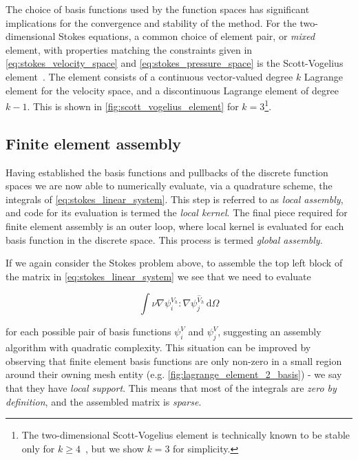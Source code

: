 \documentclass[thesis]{subfiles}
\begin{document}
The choice of basis functions used by the function spaces has significant implications for the convergence and stability of the method.
For the two-dimensional Stokes equations, a common choice of element pair, or \textit{mixed} element, with properties matching the constraints given in \cref{eq:stokes_velocity_space} and \cref{eq:stokes_pressure_space} is the Scott-Vogelius element~\cite{scottNormEstimatesMaximal1985}.
The element consists of a continuous vector-valued degree $k$ Lagrange element for the velocity space, and a discontinuous Lagrange element of degree $k-1$.
This is shown in \cref{fig:scott_vogelius_element} for $k = 3$\footnote{The two-dimensional Scott-Vogelius element is technically known to be stable only for $k \geq 4$~\cite{guzmanScottVogeliusFiniteElements2018}, but we show $k = 3$ for simplicity.}.

\subsection{Finite element assembly}

Having established the basis functions and pullbacks of the discrete function spaces we are now able to numerically evaluate, via a quadrature scheme, the integrals of \cref{eq:stokes_linear_system}.
This step is referred to as \textit{local assembly}, and code for its evaluation is termed the \textit{local kernel}.
The final piece required for finite element assembly is an outer loop, where local kernel is evaluated for each basis function in the discrete space.
This process is termed \textit{global assembly}.

If we again consider the Stokes problem above, to assemble the top left block of the matrix in \cref{eq:stokes_linear_system} we see that we need to evaluate

\begin{equation}
  \int \nu \nabla \psi^{V_h}_i : \nabla \psi^{\hat V_h}_j \, \textrm{d}\Omega
\end{equation}

\noindent
for each possible pair of basis functions $\psi^V_i$ and $\psi^V_j$, suggesting an assembly algorithm with quadratic complexity.
This situation can be improved by observing that finite element basis functions are only non-zero in a small region around their owning mesh entity (e.g. \cref{fig:lagrange_element_2_basis}) - we say that they have \textit{local support}.
This means that most of the integrals are \textit{zero by definition}, and the assembled matrix is \textit{sparse}.
\end{document}
